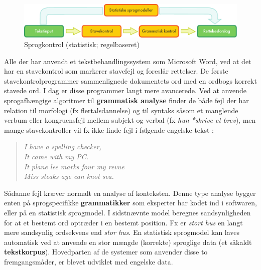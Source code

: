 \begin{multicols}{2}
\begin{figure}[htb]
  \center
  \includegraphics[width=\textwidth]{../_media/danish/language_checking}
  \caption{Sprogkontrol (statistisk; regelbaseret)}
  \label{fig:langcheckingaarch_de}
\end{figure}

Alle der har anvendt et tekstbehandlingssystem som Microsoft Word, ved at det har en stavekontrol som mar\-kerer stavefejl og foresl\aa r rettelser. De f\o rste stavekontrolprogrammer sammenlignede dokumentets ord med en ordbogs korrekt stavede ord. I dag er disse programmer langt mere avancerede. Ved at anvende sprogafh\ae ngige algoritmer til {\bf grammatisk analyse} finder de b\aa de fejl der har relation til morfologi (fx flertalsdannelse) og til syntaks s\aa som et manglende verbum eller kongruensfejl mellem subjekt og verbal (fx {\it hun *skrive et brev}), men mange stavekontroller vil fx ikke finde fejl i f\o lgende engelske tekst \cite{zar1}:

\begin{quote}
 {\it  I have a spelling checker,\\
  It came with my PC.\\
  It plane lee marks four my revue\\
  Miss steaks aye can knot sea.}
\end{quote}

S\aa danne fejl kr\ae ver normalt en analyse af konteksten. Denne type analyse bygger enten \mbox{p\aa} sprogspecifikke {\bf grammatikker} som eksperter har kodet ind i softwaren, eller \mbox{p\aa} en statistisk sprogmodel. I sidstn\ae vnte model beregnes sandsynligheden for at et bestemt ord optr\ae der i en bestemt position. Fx er {\it stort hus}  en langt mere sandsynlig ordsekvens end {\it stor hus}. En statistisk sprogmodel kan laves automatisk ved at anvende en stor m\ae ngde (korrekte) sproglige data (et s\aa kaldt {\bf tekstkorpus}). Hovedparten af de systemer som anvender disse to fremgangsm\aa der, er blevet udviklet med engelske data. 


\end{multicols}
